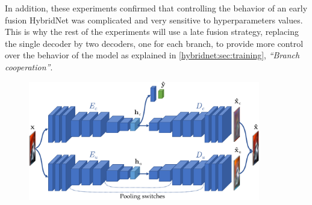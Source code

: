 In addition, these experiments confirmed that controlling the behavior of an early fusion HybridNet was complicated and very sensitive to hyperparameters values. This is why the rest of the experiments will use a late fusion strategy, replacing the single decoder by two decoders, one for each branch, to provide more control over the behavior of the model as explained in \autoref{hybridnet:sec:training}, \textit{``Branch cooperation''}.

\begin{figure}[t]
	\centering
	\includegraphics[width=0.9\textwidth]{images/hybridnet_convlarge}
    \label{hybridnet:fig:cifar10-archi}
\end{figure}

